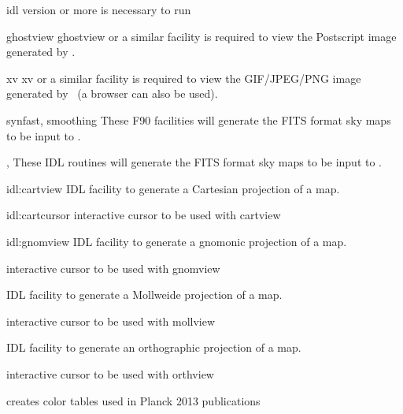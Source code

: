 \newpage
\begin{related}
  \begin{sulist}{} %
  \item[idl] version \idlversion or more is necessary to run \thedocid
  \item[ghostview] ghostview or a similar facility is required to view
	  the Postscript image generated by \thedocid.
  \item[xv] xv or a similar facility is required to view the
            GIF/JPEG/PNG image generated by \thedocid \ (a browser can also 
            be used).
  \item[synfast, smoothing] These F90 \healpix facilities will generate the FITS format 
            sky maps to be input to \thedocid.
  \item[\htmlref{isynfast}{idl:isynfast}, \htmlref{ismoothing}{idl:ismoothing}] These IDL routines will generate the FITS format 
            sky maps to be input to \thedocid.
  \item[{\htmlref{cartview} {idl:cartview}}] 
	IDL facility to generate a Cartesian projection of
  	a \healpix map.
  \item[{\htmlref{cartcursor} {idl:cartcursor}}] 
	interactive cursor to be used with cartview
  \item[{\htmlref{gnomview} {idl:gnomview}}] 
	IDL facility to generate a gnomonic projection of
  	a \healpix map.
  \item[{\htmlref{gnomcursor}{idl:gnomcursor}}] 
	interactive cursor to be used with gnomview
  \item[{\htmlref{mollview}{idl:mollview}}] 
	IDL facility to generate a Mollweide projection of
  	a \healpix map.
  \item[{\htmlref{mollcursor}{idl:mollcursor}}] interactive cursor to be used with mollview
  \item[{\htmlref{orthview}{idl:orthview}}] 
	IDL facility to generate an orthographic projection of
  	a \healpix map.
  \item[{\htmlref{orthcursor}{idl:orthcursor}}] 
	interactive cursor to be used with orthview
  \item[{\htmlref{planck\_colors}{idl:planck_colors}}]
        creates color tables used in Planck 2013 publications
  \end{sulist}
\end{related}



